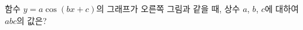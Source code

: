 \noindent\begin{minipage}[t]{0.58\linewidth}\vspace{0pt}\raggedright 함수 $y=a\cos(bx+c)$의 그래프가 오른쪽 그림과 같을 때, 상수 $a$, $b$, $c$에 대하여 $abc$의 값은? \end{minipage}\hfill\begin{minipage}[t]{0.4\linewidth}\vspace{0pt}\centering \resizebox{\ifdim\width>\linewidth\linewidth\else\width\fi}{!}{}\end{minipage}\par
{}
